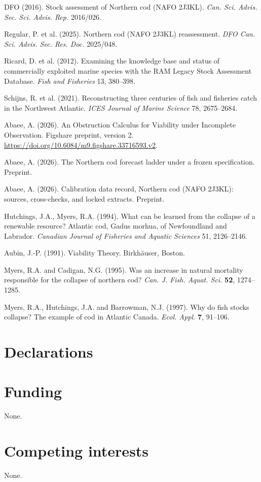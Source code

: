 \documentclass[10pt,twocolumn]{article}
\theoremstyle{plain}
\theoremstyle{remark}
\begin{document}
{\footnotesize
DFO (2016). Stock assessment of Northern cod (NAFO 2J3KL). \emph{Can.
Sci. Advis. Sec. Sci. Advis. Rep.} 2016/026.

Regular, P. et al. (2025). Northern cod (NAFO 2J3KL) reassessment.
\emph{DFO Can. Sci. Advis. Sec. Res. Doc.} 2025/048.

Ricard, D. et al. (2012). Examining the knowledge base and status of
commercially exploited marine species with the RAM Legacy Stock
Assessment Database. \emph{Fish and Fisheries} 13, 380--398.

Schijns, R. et al. (2021). Reconstructing three centuries of fish and
fisheries catch in the Northwest Atlantic. \emph{ICES Journal of Marine
Science} 78, 2675--2684.

Abaee, A. (2026). An Obstruction Calculus for Viability under Incomplete Observation. Figshare preprint, version 2. \url{https://doi.org/10.6084/m9.figshare.33716593.v2}.

Abaee, A. (2026). The Northern cod forecast ladder under a frozen
specification. Preprint.

Abaee, A. (2026). Calibration data record, Northern cod (NAFO 2J3KL):
sources, cross-checks, and locked extracts. Preprint.

Hutchings, J.A., Myers, R.A. (1994). What can be learned from the
collapse of a renewable resource? Atlantic cod, Gadus morhua, of
Newfoundland and Labrador. \emph{Canadian Journal of Fisheries and
Aquatic Sciences} 51, 2126--2146.

Aubin, J.-P. (1991). Viability Theory. Birkh\"auser, Boston.

Myers, R.A. and Cadigan, N.G. (1995). Was an increase in natural mortality responsible for
the collapse of northern cod? \emph{Can. J. Fish. Aquat. Sci.} \textbf{52}, 1274--1285.

Myers, R.A., Hutchings, J.A. and Barrowman, N.J. (1997). Why do fish stocks collapse? The
example of cod in Atlantic Canada. \emph{Ecol. Appl.} \textbf{7}, 91--106.
}

\section*{Declarations}

\section*{Funding}
None.

\section*{Competing interests}
None.
\end{document}
